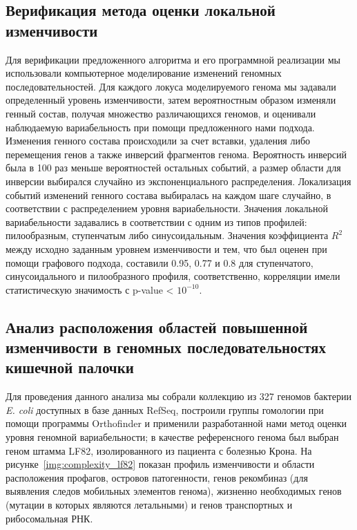 \subsection*{Верификация метода оценки локальной изменчивости}
Для верификации предложенного алгоритма и его программной реализации мы использовали компьютерное моделирование изменений геномных последовательностей. Для каждого локуса моделируемого генома мы задавали определенный уровень изменчивости, затем вероятностным образом изменяли генный состав, получая множество различающихся геномов, и оценивали наблюдаемую вариабельность при помощи предложенного нами подхода. Изменения генного состава происходили за счет вставки, удаления либо перемещения генов а также инверсий фрагментов генома. Вероятность инверсий была в 100 раз меньше вероятностей остальных событий, а размер области для инверсии выбирался случайно из экспоненциального распределения. Локализация событий изменений генного состава выбиралась на каждом шаге случайно, в соответствии с распределением уровня вариабельности. Значения локальной вариабельности задавались в соответствии с одним из типов профилей: пилообразным, ступенчатым либо синусоидальным. Значения коэффициента $R^2$ между исходно заданным уровнем изменчивости и тем, что был оценен при помощи графового подхода, составили 0.95, 0.77 и 0.8 для ступенчатого, синусоидального и пилообразного профиля, соответственно, корреляции имели статистическую значимость с p-value < $10^{-10}$.

\subsection*{Анализ расположения областей повышенной изменчивости в геномных последовательностях кишечной палочки}
Для проведения данного анализа мы собрали коллекцию из 327 геномов бактерии \textit{E. coli} доступных в базе данных RefSeq, построили группы гомологии при помощи программы Orthofinder и применили разработанной нами метод оценки уровня геномной вариабельности; в качестве референсного генома был выбран геном штамма LF82, изолированного из пациента с болезнью Крона. На рисунке~\ref{img:complexity_lf82} показан профиль изменчивости и области расположения профагов, островов патогенности, генов рекомбиназ (для выявления следов мобильных элементов генома), жизненно необходимых генов (мутации в которых являются летальными) и генов транспортных и рибосомальная РНК.

